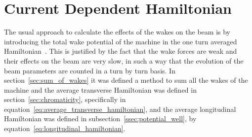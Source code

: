 \section{Current Dependent Hamiltonian}

    The usual approach to calculate the effects of the wakes on the beam is by introducing the total wake potential of the machine in the one turn averaged Hamiltonian~\cite{Berg1996,Lindberg2016}. This is justified by the fact that the wake forces are weak and their effects on the beam are very slow, in such a way that the evolution of the beam parameters are counted in a turn by turn basis. In section~\ref{sec:sum_of_wakes} it was defined a method to sum all the wakes of the machine and the average transverse Hamiltonian was defined in section~\ref{sec:chromaticity}, specifically in equation~\eqref{eq:average_transverse_hamiltonian}, and the average longitudinal Hamiltonian was defined in subsection~\ref{ssec:potential_well}, by equation~\eqref{eq:longitudinal_hamiltonian}.

